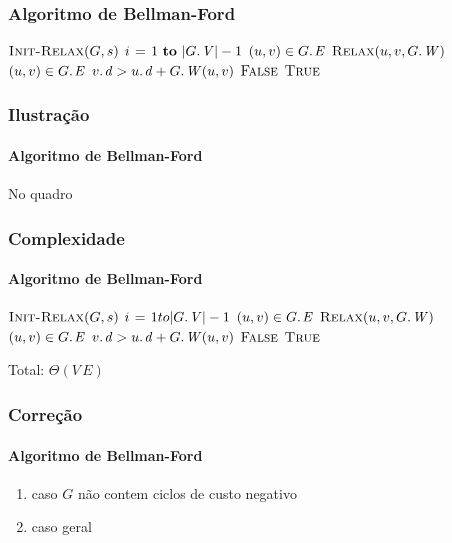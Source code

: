\documentclass{beamer}
\begin{document}
\begin{frame}
\frametitle{Algoritmo de Bellman-Ford}

\begin{codebox}
\li $\textnormal{\scshape Init-Relax}(G, s)$
\li \For $i \gets 1 \To |\attrib{G}{V}| - 1$
\li \Do \For $(u, v) \in \attrib{G}{E}$
\li   \Do $\proc{Relax}(u, v, \attrib{G}{W})$
      \End
    \End
\li \For $(u, v) \in \attrib{G}{E}$
\li \Do \If $\attrib{v}{d} > \attrib{u}{d} + \attrib{G}{W}(u, v)$
\li   \Then \Return $\textnormal{\scshape False}$
      \End
    \End
\li \Return $\textnormal{\scshape True}$
\end{codebox}

\end{frame}

\begin{frame}
\frametitle{Ilustração}
\framesubtitle{Algoritmo de Bellman-Ford}

No quadro

\end{frame}

\begin{frame}
\frametitle{Complexidade}
\framesubtitle{Algoritmo de Bellman-Ford}

\begin{codebox}
\li $\textnormal{\scshape Init-Relax}(G, s)$  
\li \For $i \gets 1 to |\attrib{G}{V}| - 1$  
\li \Do \For $(u, v) \in \attrib{G}{E}$ 
\li   \Do $\proc{Relax}(u, v, \attrib{G}{W})$ 
      \End
    \End
\li \For $(u, v) \in \attrib{G}{E}$ 
\li \Do \If $\attrib{v}{d} > \attrib{u}{d} + \attrib{G}{W}(u, v)$
\li   \Then \Return $\textnormal{\scshape False}$
      \End
    \End
\li \Return $\textnormal{\scshape True}$
\end{codebox}
\pause
\alert{Total: $\Theta(V \, E)$}
\end{frame}

\begin{frame}
\frametitle{Correção}
\framesubtitle{Algoritmo de Bellman-Ford}

\begin{enumerate}
\item caso $G$ não contem ciclos de custo negativo
\item caso geral
\end{enumerate}

\end{frame}
\end{document}
